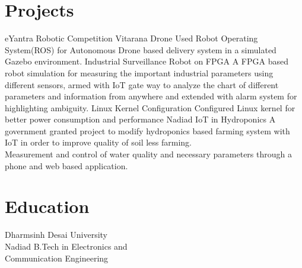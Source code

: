 \documentclass[%
               doublesided,
               paper=a4,
               fontsize=10pt
              ]{my-resume}
\begin{document}
{    \section[\faRocket]{Projects}
        {eYantra Robotic Competition}
        {Vitarana Drone}
        {Used Robot Operating System(ROS) for Autonomous Drone based delivery system in a simulated Gazebo environment. }
        {}
        {Industrial Surveillance Robot on FPGA}
        {A FPGA based robot simulation for measuring the important industrial parameters using different sensors, armed with IoT gate way to analyze the chart of different parameters and information from anywhere and extended with alarm system for highlighting ambiguity. }
        {}
        {Linux Kernel Configuration}
        {Configured Linux kernel for better power consumption and performance }
        {Nadiad}
        {IoT in Hydroponics}
        {A government granted project to modify hydroponics based farming system with IoT in order to improve quality of soil less farming.
        \\Measurement and control of water quality and necessary parameters through a phone and web based application. }
    
    \section[\faMortarBoard]{Education}
        {Dharmsinh Desai University \\Nadiad}
        {B.Tech in  Electronics and \\Communication Engineering}
        {}

}
\makebody
\clearpage
\end{document}
